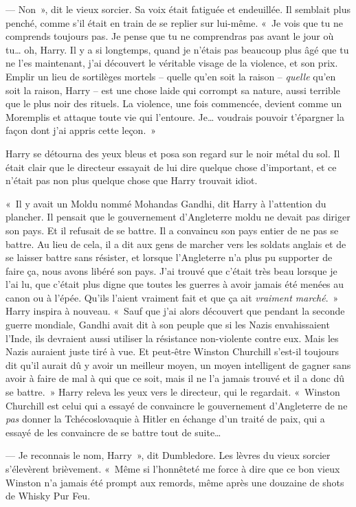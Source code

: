--- Non~», dit le vieux sorcier. Sa voix était fatiguée et endeuillée. Il semblait plus penché, comme s'il était en train de se replier sur lui-même. «~Je vois que tu ne comprends toujours pas. Je pense que tu ne comprendras pas avant le jour où tu… oh, Harry. Il y a si longtemps, quand je n'étais pas beaucoup plus âgé que tu ne l'es maintenant, j'ai découvert le véritable visage de la violence, et son prix. Emplir un lieu de sortilèges mortels -- quelle qu'en soit la raison -- \emph{quelle} qu'en soit la raison, Harry -- est une chose laide qui corrompt sa nature, aussi terrible que le plus noir des rituels. La violence, une fois commencée, devient comme un Moremplis et attaque toute vie qui l'entoure. Je… voudrais pouvoir t'épargner la façon dont j'ai appris cette leçon.~»

Harry se détourna des yeux bleus et posa son regard sur le noir métal du sol. Il était clair que le directeur essayait de lui dire quelque chose d'important, et ce n'était pas non plus quelque chose que Harry trouvait idiot.

«~Il y avait un Moldu nommé Mohandas Gandhi, dit Harry à l'attention du plancher. Il pensait que le gouvernement d'Angleterre moldu ne devait pas diriger son pays. Et il refusait de se battre. Il a convaincu son pays entier de ne pas se battre. Au lieu de cela, il a dit aux gens de marcher vers les soldats anglais et de se laisser battre sans résister, et lorsque l'Angleterre n'a plus pu supporter de faire ça, nous avons libéré son pays. J'ai trouvé que c'était très beau lorsque je l'ai lu, que c'était plus digne que toutes les guerres à avoir jamais été menées au canon ou à l'épée. Qu'ils l'aient vraiment fait et que ça ait \emph{vraiment marché}.~» Harry inspira à nouveau. «~Sauf que j'ai alors découvert que pendant la seconde guerre mondiale, Gandhi avait dit à son peuple que si les Nazis envahissaient l'Inde, ils devraient aussi utiliser la résistance non-violente contre eux. Mais les Nazis auraient juste tiré à vue. Et peut-être Winston Churchill s'est-il toujours dit qu'il aurait dû y avoir un meilleur moyen, un moyen intelligent de gagner sans avoir à faire de mal à qui que ce soit, mais il ne l'a jamais trouvé et il a donc dû se battre.~» Harry releva les yeux vers le directeur, qui le regardait. «~Winston Churchill est celui qui a essayé de convaincre le gouvernement d'Angleterre de ne \emph{pas} donner la Tchécoslovaquie à Hitler en échange d'un traité de paix, qui a essayé de les convaincre de se battre tout de suite…

--- Je reconnais le nom, Harry~», dit Dumbledore. Les lèvres du vieux sorcier s'élevèrent brièvement. «~Même si l'honnêteté me force à dire que ce bon vieux Winston n'a jamais été prompt aux remords, même après une douzaine de shots de Whisky Pur Feu.

